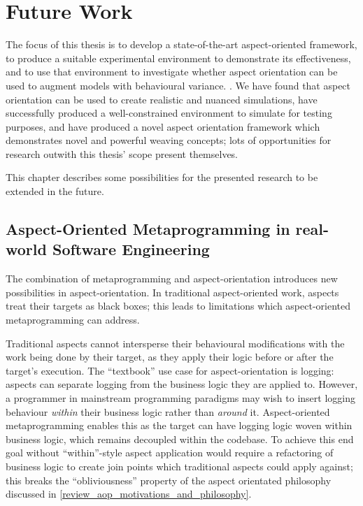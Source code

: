 \chapter{Future Work}\label{chap:future_work}

The focus of this thesis is to develop a state-of-the-art aspect-oriented
framework, to produce a suitable experimental environment to demonstrate its
effectiveness, and to use that environment to investigate whether aspect
orientation can be used to augment models with behavioural variance. . We
have found that aspect orientation can be used to create realistic and nuanced
simulations, have successfully produced a well-constrained environment to
simulate for testing purposes, and have produced a novel aspect orientation
framework which demonstrates novel and powerful weaving concepts; lots of
opportunities for research outwith this thesis' scope present themselves.

This chapter describes some possibilities for the presented research to be
extended in the future.


\section{Aspect-Oriented Metaprogramming in real-world Software Engineering}
\label{future_work_aspect_oriented_metaprogramming}

The combination of metaprogramming and aspect-orientation introduces new
possibilities in aspect-orientation. In traditional aspect-oriented work,
aspects treat their targets as black boxes; this leads to limitations
which aspect-oriented metaprogramming can address.

Traditional aspects cannot intersperse their behavioural modifications with the
work being done by their target, as they apply their logic before or after the
target's execution. The ``textbook'' use case for aspect-orientation is logging:
aspects can separate logging from the business logic they are applied to.
However, a programmer in mainstream programming paradigms may wish to insert
logging behaviour \emph{within} their business logic rather than \emph{around}
it. Aspect-oriented metaprogramming enables this as the target can have logging
logic woven within business logic, which remains decoupled within the codebase.
To achieve this end goal without ``within''-style aspect application would
require a refactoring of business logic to create join points which traditional
aspects could apply against; this breaks the ``obliviousness'' property of the
aspect orientated philosophy discussed in
\cref{review_aop_motivations_and_philosophy}.


